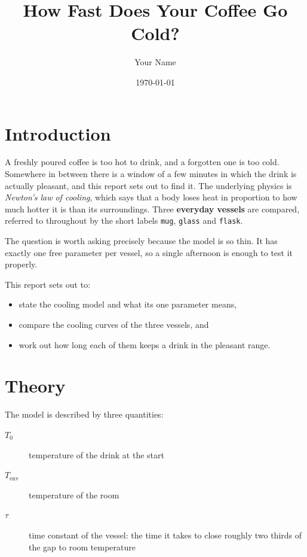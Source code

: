 \documentclass[a4paper,11pt]{article}
\title{How Fast Does Your Coffee Go Cold?}
\author{Your Name}
\date{\today}
\begin{document}
\maketitle
\tableofcontents

\section{Introduction}\label{sec:introduction}

A freshly poured coffee is too hot to drink, and a forgotten one is too cold.
Somewhere in between there is a window of a few minutes in which the drink is actually pleasant,
and this report sets out to find it.
The underlying physics is \emph{Newton's law of cooling},
which says that a body loses heat in proportion to how much hotter it is than its surroundings.
Three \textbf{everyday vessels} are compared,
referred to throughout by the short labels \texttt{mug}, \texttt{glass} and \texttt{flask}.

The question is worth asking precisely because the model is so thin.
It has exactly one free parameter per vessel,
so a single afternoon is enough to test it properly.

This report sets out to:

\begin{itemize}
    \item state the cooling model and what its one parameter means,
    \item compare the cooling curves of the three vessels, and
    \item work out how long each of them keeps a drink in the pleasant range.
\end{itemize}

\section{Theory}\label{sec:theory}

The model is described by three quantities:

\begin{description}
    \item[$T_0$] temperature of the drink at the start
    \item[$T_\mathrm{env}$] temperature of the room
    \item[$\tau$] time constant of the vessel: the time it takes to close
        roughly two thirds of the gap to room temperature
\end{description}
\end{document}
